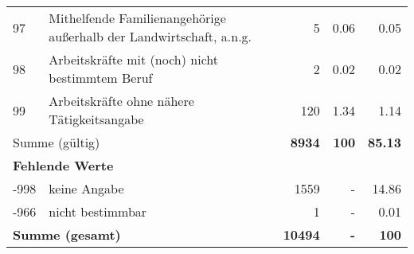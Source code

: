 \begin{longtable}{lXrrr}
        97 & \multicolumn{1}{X}{Mithelfende Familienangehörige außerhalb der Landwirtschaft, a.n.g.} & %
          \num{5} &
          \num[round-mode=places,round-precision=2]{0,06} &
          \num[round-mode=places,round-precision=2]{0,05} \\

        98 & \multicolumn{1}{X}{Arbeitskräfte mit (noch) nicht bestimmtem Beruf} & %
          \num{2} &
          \num[round-mode=places,round-precision=2]{0,02} &
          \num[round-mode=places,round-precision=2]{0,02} \\

        99 & \multicolumn{1}{X}{Arbeitskräfte ohne nähere Tätigkeitsangabe} & %
          \num{120} &
          \num[round-mode=places,round-precision=2]{1,34} &
          \num[round-mode=places,round-precision=2]{1,14} \\

     \midrule
     \multicolumn{2}{l}{Summe (gültig)} &
       \textbf{\num{8934}} &
     \textbf{100} &
       \textbf{\num[round-mode=places,round-precision=2]{85,13}} \\
     \multicolumn{5}{l}{\textbf{Fehlende Werte}}\\
       -998 &
       keine Angabe &
         \num{1559} &
        - &
         \num[round-mode=places,round-precision=2]{14,86} \\
       -966 &
       nicht bestimmbar &
         \num{1} &
        - &
         \num[round-mode=places,round-precision=2]{0,01} \\
     \midrule
     \multicolumn{2}{l}{\textbf{Summe (gesamt)}} &
          \textbf{\num{10494}} &
        \textbf{-} &
        \textbf{100} \\
     \bottomrule
     \end{longtable}
     

